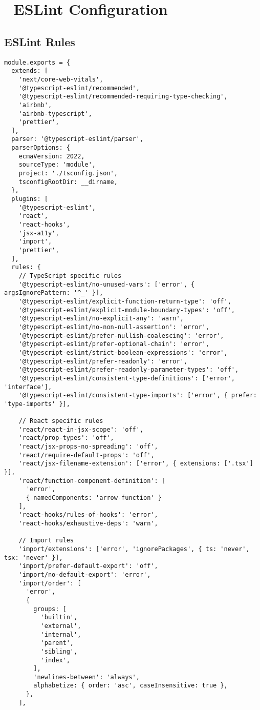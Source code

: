 \documentclass[11pt,a4paper]{article}
\begin{document}
\section{🎨 ESLint Configuration}

\subsection{ESLint Rules}

\begin{lstlisting}[style=typescript, caption=ESLint Configuration (.eslintrc.js)]
module.exports = {
  extends: [
    'next/core-web-vitals',
    '@typescript-eslint/recommended',
    '@typescript-eslint/recommended-requiring-type-checking',
    'airbnb',
    'airbnb-typescript',
    'prettier',
  ],
  parser: '@typescript-eslint/parser',
  parserOptions: {
    ecmaVersion: 2022,
    sourceType: 'module',
    project: './tsconfig.json',
    tsconfigRootDir: __dirname,
  },
  plugins: [
    '@typescript-eslint',
    'react',
    'react-hooks',
    'jsx-a11y',
    'import',
    'prettier',
  ],
  rules: {
    // TypeScript specific rules
    '@typescript-eslint/no-unused-vars': ['error', { argsIgnorePattern: '^_' }],
    '@typescript-eslint/explicit-function-return-type': 'off',
    '@typescript-eslint/explicit-module-boundary-types': 'off',
    '@typescript-eslint/no-explicit-any': 'warn',
    '@typescript-eslint/no-non-null-assertion': 'error',
    '@typescript-eslint/prefer-nullish-coalescing': 'error',
    '@typescript-eslint/prefer-optional-chain': 'error',
    '@typescript-eslint/strict-boolean-expressions': 'error',
    '@typescript-eslint/prefer-readonly': 'error',
    '@typescript-eslint/prefer-readonly-parameter-types': 'off',
    '@typescript-eslint/consistent-type-definitions': ['error', 'interface'],
    '@typescript-eslint/consistent-type-imports': ['error', { prefer: 'type-imports' }],
    
    // React specific rules
    'react/react-in-jsx-scope': 'off',
    'react/prop-types': 'off',
    'react/jsx-props-no-spreading': 'off',
    'react/require-default-props': 'off',
    'react/jsx-filename-extension': ['error', { extensions: ['.tsx'] }],
    'react/function-component-definition': [
      'error',
      { namedComponents: 'arrow-function' }
    ],
    'react-hooks/rules-of-hooks': 'error',
    'react-hooks/exhaustive-deps': 'warn',
    
    // Import rules
    'import/extensions': ['error', 'ignorePackages', { ts: 'never', tsx: 'never' }],
    'import/prefer-default-export': 'off',
    'import/no-default-export': 'error',
    'import/order': [
      'error',
      {
        groups: [
          'builtin',
          'external',
          'internal',
          'parent',
          'sibling',
          'index',
        ],
        'newlines-between': 'always',
        alphabetize: { order: 'asc', caseInsensitive: true },
      },
    ],
    

\end{lstlisting}
\end{document}
